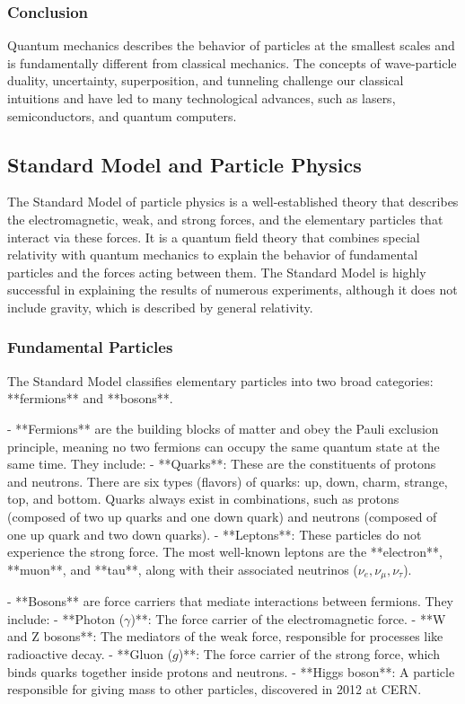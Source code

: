 \documentclass{article}
\begin{document}
\subsubsection*{Conclusion}

Quantum mechanics describes the behavior of particles at the smallest scales and is fundamentally different from classical mechanics. The concepts of wave-particle duality, uncertainty, superposition, and tunneling challenge our classical intuitions and have led to many technological advances, such as lasers, semiconductors, and quantum computers.

\subsection{Standard Model and Particle Physics}

The Standard Model of particle physics is a well-established theory that describes the electromagnetic, weak, and strong forces, and the elementary particles that interact via these forces. It is a quantum field theory that combines special relativity with quantum mechanics to explain the behavior of fundamental particles and the forces acting between them. The Standard Model is highly successful in explaining the results of numerous experiments, although it does not include gravity, which is described by general relativity.

\subsubsection*{Fundamental Particles}

The Standard Model classifies elementary particles into two broad categories: **fermions** and **bosons**.

- **Fermions** are the building blocks of matter and obey the Pauli exclusion principle, meaning no two fermions can occupy the same quantum state at the same time. They include:
  - **Quarks**: These are the constituents of protons and neutrons. There are six types (flavors) of quarks: up, down, charm, strange, top, and bottom. Quarks always exist in combinations, such as protons (composed of two up quarks and one down quark) and neutrons (composed of one up quark and two down quarks).
  - **Leptons**: These particles do not experience the strong force. The most well-known leptons are the **electron**, **muon**, and **tau**, along with their associated neutrinos (\( \nu_e, \nu_\mu, \nu_\tau \)).

- **Bosons** are force carriers that mediate interactions between fermions. They include:
  - **Photon (\( \gamma \))**: The force carrier of the electromagnetic force.
  - **W and Z bosons**: The mediators of the weak force, responsible for processes like radioactive decay.
  - **Gluon (\( g \))**: The force carrier of the strong force, which binds quarks together inside protons and neutrons.
  - **Higgs boson**: A particle responsible for giving mass to other particles, discovered in 2012 at CERN.
\end{document}
